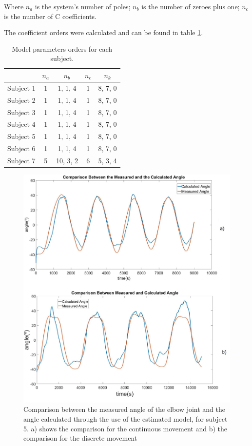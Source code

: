 Where \(n_a\) is the system's number of poles; \(n_b\) is the number of zeroes plus one; \(n_c\) is the number of C coefficients.

The coefficient orders were calculated and can be found in table \ref{ta:order}.

\begin{table}[h]
\caption{Model parameters orders for each subject.}
\label{table_example}
\begin{center}
\begin{tabular}{|c|c|c|c|c|}
\hline
 & \(n_a\) & \(n_b\) & \(n_c\) & \(n_k\)\\
\hline \hline
Subject 1 & 1 & 1, 1, 4 & 1 & 8, 7, 0\\
\hline
Subject 2 & 1 & 1, 1, 4 & 1 & 8, 7, 0\\
\hline
Subject 3 & 1 & 1, 1, 4 & 1 & 8, 7, 0\\
\hline
Subject 4 & 1 & 1, 1, 4 & 1 & 8, 7, 0\\
\hline
Subject 5 & 1 & 1, 1, 4 & 1 & 8, 7, 0\\
\hline
Subject 6 & 1 & 1, 1, 4 &1 & 8, 7, 0\\
\hline
Subject 7 & 5 & 10, 3, 2 & 6 & 5, 3, 4\\
\hline
\end{tabular}
\end{center}

\label{ta:order}
\end{table}

\begin{figure}[thpb]
      \centering
      \includegraphics[scale=0.3]{Images/3kg.jpg}
      \caption{Comparison between the measured angle of the elbow joint and the angle calculated through the use of the estimated model, for subject 5. a) shows the comparison for the continuous movement and b) the comparison for the discrete movement}
      \label{Angle Comparison}
   \end{figure}

